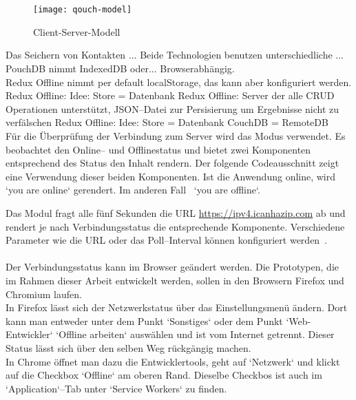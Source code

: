 \\\\
%
% 
%
\begin{figure}[H]
  \centering
  \texttt{[image: qouch-model]}
  \grayRule
  \caption{Client-Server-Modell}
  \label{fig:qouch-model}
\end{figure}
%
%
Das Seichern von Kontakten ...
Beide Technologien benutzen unterschiedliche ... 
PouchDB nimmt IndexedDB oder... Browserabhängig.\\
Redux Offline nimmt per default localStorage, das kann aber konfiguriert werden.
Redux Offline: Idee: Store = Datenbank
%
%
Redux Offline: Server der alle \gls{CRUD} Operationen unterstützt,
\gls{JSON}--Datei zur Persisierung um Ergebnisse nicht zu verfälschen 
Redux Offline: Idee: Store = Datenbank
CouchDB = RemoteDB\\
%
%
Für die Überprüfung der Verbindung zum Server wird das Modus  verwendet. Es beobachtet den Online-- und Offlinestatus und bietet zwei Komponenten entsprechend des Status den Inhalt rendern. Der folgende Codeausschnitt zeigt eine Verwendung dieser beiden Komponenten. Ist die Anwendung online, wird `you are online` gerendert. Im anderen Fall ~`you are offline`.
\begin{center}

\end{center}
Das Modul fragt alle fünf Sekunden die URL \url{https://ipv4.icanhazip.com} ab und rendert je nach Verbindungsstatus die entsprechende Komponente. Verschiedene Parameter wie die URL oder das Poll--Interval können konfiguriert werden~\cite{react-detect}.\\\\
Der Verbindungsstatus kann im Browser geändert werden. Die Prototypen, die im Rahmen dieser Arbeit entwickelt werden, sollen in den Browsern Firefox und Chromium laufen.\\
In Firefox lässt sich der Netzwerkstatus über das Einstellungsmenü ändern. Dort kann man entweder unter dem Punkt `Sonstiges` oder dem Punkt `Web-Entwickler` `Offline arbeiten` auswählen und ist vom Internet getrennt. Dieser Status lässt sich über den selben Weg rückgängig machen.\\
In Chrome öffnet man dazu die Entwicklertools, geht auf `Netzwerk` und klickt auf die Checkbox `Offline` am oberen Rand. Dieselbe Checkbos ist auch im `Application`--Tab unter `Service Workers` zu finden.
%
%
